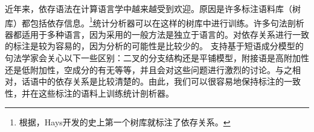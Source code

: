 

近年来，依存语法在计算语言学中越来越受到欢迎。原因是许多标注语料库（树库）都包括依存信息。\footnote{
根据\citet{Kay2000a-u}，Hays开发的史上第一个树库就标注了依存关系。}统计分析器可以在这样的树库中进行训练\citep{YM2003a-u,Attardi2006a-u,Nivre2003a-u,KMcDN2009a-u,Bohnet2010a-u}。许多句法剖析器都适用于多种语言，因为采用的一般方法是独立于语言的。对依存关系进行一致的标注是较为容易的，因为分析的可能性是比较少的。
支持基于短语成分模型的句法学家会关心以下一些区别：二叉的分支结构还是平铺模型，附接语是高附加性还是低附加性，空成分的有无等等，并且会对这些问题进行激烈的讨论。与之相对，话语中的依存关系是比较清楚的。由此，我们可以很容易地保持标注的一致性，并在这些标注的语料上训练统计剖析器。

